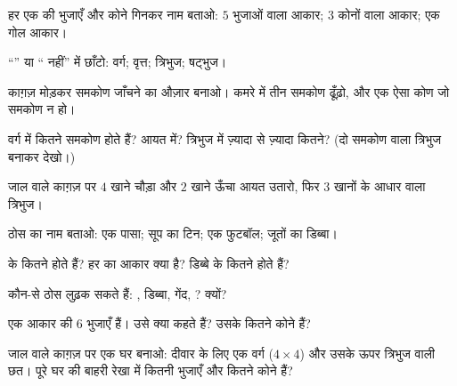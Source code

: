 \begin{exercise}[$\star$]\label{exo:g2:shapes:1}
हर एक की भुजाएँ और कोने गिनकर नाम बताओ: $5$ भुजाओं वाला आकार;
$3$ कोनों वाला आकार; एक गोल आकार।
\end{exercise}

\begin{exercise}[$\star$]\label{exo:g2:shapes:2}
``'' या `` नहीं'' में छाँटो: वर्ग; वृत्त;
त्रिभुज; षट्भुज।
\end{exercise}

\begin{exercise}[$\star$]\label{exo:g2:shapes:3}
काग़ज़ मोड़कर समकोण जाँचने का औज़ार बनाओ। कमरे में तीन समकोण
ढूँढ़ो, और एक ऐसा कोण जो समकोण न हो।
\end{exercise}

\begin{exercise}[$\star$]\label{exo:g2:shapes:4}
वर्ग में कितने समकोण होते हैं? आयत में? त्रिभुज में ज़्यादा से
ज़्यादा कितने? (दो समकोण वाला त्रिभुज बनाकर देखो।)
\end{exercise}

\begin{exercise}[$\star$]\label{exo:g2:shapes:5}
जाल वाले काग़ज़ पर $4$ खाने चौड़ा और $2$ खाने ऊँचा आयत उतारो,
फिर $3$ खानों के आधार वाला त्रिभुज।
\end{exercise}

\begin{exercise}[$\star$]\label{exo:g2:shapes:6}
ठोस का नाम बताओ: एक पासा; सूप का टिन; एक फुटबॉल; जूतों का डिब्बा।
\end{exercise}

\begin{exercise}[$\star$]\label{exo:g2:shapes:7}
 के कितने  होते हैं? हर  का आकार क्या है? डिब्बे के
कितने  होते हैं?
\end{exercise}

\begin{exercise}[$\star$]\label{exo:g2:shapes:8}
कौन-से ठोस लुढ़क सकते हैं: , डिब्बा, गेंद, ?
क्यों?
\end{exercise}

\begin{exercise}[$\star$]\label{exo:g2:shapes:9}
एक आकार की $6$ भुजाएँ हैं। उसे क्या कहते हैं? उसके कितने कोने हैं?
\end{exercise}

\begin{exercise}[$\star\star$]\label{exo:g2:shapes:10}
जाल वाले काग़ज़ पर एक घर बनाओ: दीवार के लिए एक वर्ग
($4 \times 4$) और उसके ऊपर त्रिभुज वाली छत। पूरे घर की बाहरी
रेखा में कितनी भुजाएँ और कितने कोने हैं?
\end{exercise}
